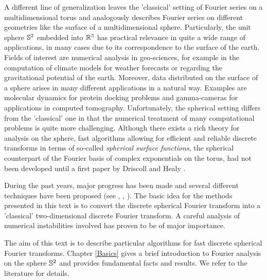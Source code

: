 A different line of generalization leaves the 'classical' setting of 
Fourier series on a multidimensional torus and analogously describes
Fourier series on different geometries like the surface of a
multidimensional sphere. Particularly, the unit sphere $\mathbb{S}^2$ 
embedded into $\mathbb{R}^3$ has practical relevance in quite a wide range of 
applications, in many cases due to its correspondence to the surface 
of the earth. Fields of interest are numerical analysis in
geo-sciences, for example in the computation of climate models for
weather forecasts or regarding the gravitational potential of the 
earth. Moreover, data distributed on the surface of a sphere arises
in many different applications in a natural way. Examples are
molecular dynamics for protein docking problems and 
gamma-cameras for applications in computed tomography.
Unfortunately, the spherical setting differs from the 'classical' 
one in that the numerical treatment of many computational problems
is quite more challenging. Although there exists a rich theory for 
analysis on the sphere, fast algorithms allowing for efficient and
reliable discrete transforms in terms of so-called 
\emph{spherical surface functions}, the spherical counterpart of the 
Fourier basis of complex exponentials on the torus,
had not been developed until a first paper by Driscoll and Healy 
\cite{drhe}.
 
During the past years, major progress has been made and several 
different techniques have been proposed (see \cite{HeRoKoMo}, 
\cite{suta}, \cite{roty}). The basic idea for the 
methods presented in this text is to convert the discrete spherical 
Fourier transform into a 'classical' two-dimensional discrete 
Fourier transform. A careful analysis
of numerical instabilities involved has proven to be of major 
importance.

The aim of this text is to describe particular algorithms for fast discrete
spherical Fourier transforms. Chapter \ref{Basics} gives a brief 
introduction to Fourier analysis on the sphere $\mathbb{S}^2$ and 
provides fundamental facts and results. We refer to the literature for 
details.

